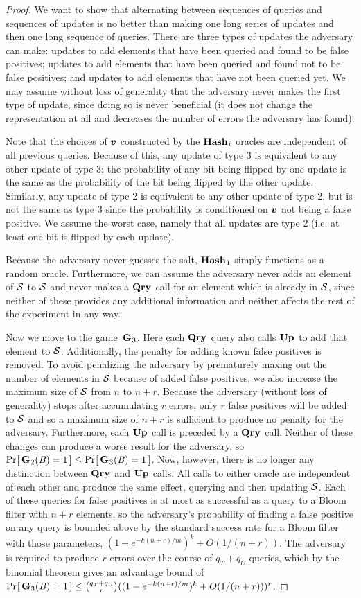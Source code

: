 \begin{proof}
We want to show that alternating between sequences of queries and sequences of updates is no better than making one long series of updates and then one long sequence of queries. There are three types of updates the adversary can make: updates to add elements that have been queried and found to be false positives; updates to add elements that have been queried and found not to be false positives; and updates to add elements that have not been queried yet. We may assume without loss of generality that the adversary never makes the first type of update, since doing so is never beneficial (it does not change the representation at all and decreases the number of errors the adversary has found).

Note that the choices of $\vv$ constructed by the $\mathbf{Hash}\hspace{0.5pt}_i$ oracles are independent of all previous queries. Because of this, any update of type 3 is equivalent to any other update of type 3; the probability of any bit being flipped by one update is the same as the probability of the bit being flipped by the other update. Similarly, any update of type 2 is equivalent to any other update of type 2, but is not the same as type 3 since the probability is conditioned on $\vv$ not being a false positive. We assume the worst case, namely that all updates are type 2 (i.e. at least one bit is flipped by each update).

Because the adversary never guesses the salt, $\mathbf{Hash}\hspace{0.5pt}_1$ simply functions as a random oracle. Furthermore, we can assume the adversary never adds an element of $\mathcal{S}$ to $\mathcal{S}$ and never makes a $\mathbf{Qry}\hspace{0.5pt}$ call for an element which is already in $\mathcal{S}$, since neither of these provides any additional information and neither affects the rest of the experiment in any way.

Now we move to the game~$\mathbf{G}\hspace{0.5pt}_3$. Here each $\mathbf{Qry}\hspace{0.5pt}$ query also calls $\mathbf{Up}\hspace{0.5pt}$ to add that element to $\mathcal{S}$. Additionally, the penalty for adding known false positives is removed. To avoid penalizing the adversary by prematurely maxing out the number of elements in $\mathcal{S}$ because of added false positives, we also increase the maximum size of $\mathcal{S}$ from $n$ to $n+r$. Because the adversary (without loss of generality) stops after accumulating $r$ errors, only $r$ false positives will be added to $\mathcal{S}$ and so a maximum size of $n+r$ is sufficient to produce no penalty for the adversary. Furthermore, each $\mathbf{Up}\hspace{0.5pt}$ call is preceded by a $\mathbf{Qry}\hspace{0.5pt}$ call. Neither of these changes can produce a worse result for the adversary, so $\Pr\hspace{-1pt}\left[\,\mathbf{G}\hspace{0.5pt}_2(\mathit{B}) = 1\,\right] \le \Pr\hspace{-1pt}\left[\,\mathbf{G}\hspace{0.5pt}_3(\mathit{B}) = 1\,\right]$. Now, however, there is no longer any distinction between $\mathbf{Qry}\hspace{0.5pt}$ and $\mathbf{Up}\hspace{0.5pt}$ calls. All calls to either oracle are independent of each other and produce the same effect, querying and then updating $\mathcal{S}$. Each of these queries for false positives is at most as successful as a query to a Bloom filter with $n+r$ elements, so the adversary's probability of finding a false positive on any query is bounded above by the standard success rate for a Bloom filter with those parameters, $(1-e^{-k(n+r)/m})^k+O(1/(n+r))$. The adversary is required to produce $r$ errors over the course of $q_T+q_U$ queries, which by the binomial theorem gives an advantage bound of $\Pr\hspace{-1pt}\left[\,\mathbf{G}\hspace{0.5pt}_3(\mathit{B}) = 1\,\right] \le \binom{q_T+q_U}{r}((1-e^{-k(n+r)/m})^k+O(1/(n+r)))^r$.


\end{proof}
